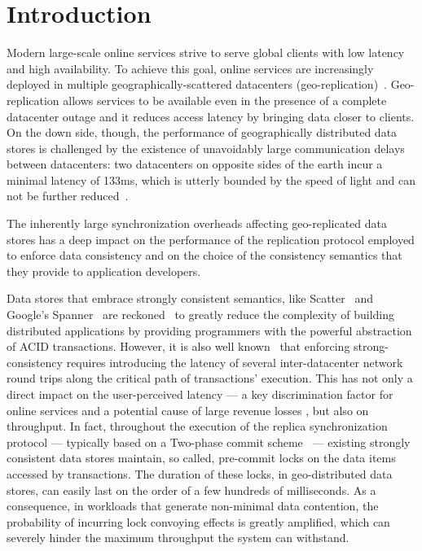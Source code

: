 \section{Introduction}
\label{sec:introduction}

Modern large-scale online services strive to serve global clients with low latency and high availability. To achieve this goal, online services are increasingly deployed in multiple geographically-scattered datacenters (geo-replication)~\cite{spanner, kraska2013mdcc, li2012making}. Geo-replication allows services to be available even in the presence of a complete datacenter outage and it reduces access latency by bringing data closer to clients. On the down side, though, the performance of geographically distributed data stores is challenged by the existence of unavoidably large communication delays between datacenters: two datacenters on opposite sides of the earth incur a minimal latency of 133ms, which is utterly bounded by the speed of light and can not be further reduced~\cite{bailis2013highly}. 

The inherently large synchronization overheads affecting geo-replicated data stores has a deep impact on the performance of the replication protocol employed to enforce data consistency and on the choice of the consistency semantics that they provide to application developers.  

Data stores that embrace strongly consistent semantics, like Scatter~\cite{scatter} and Google's Spanner~\cite{spanner} are reckoned~\cite{shute2012f1} to greatly reduce the complexity of building distributed applications by providing programmers with the powerful abstraction of ACID transactions. However, it is also well known~\cite{brewer2012cap}  that enforcing strong-consistency requires introducing the latency of several inter-datacenter network round trips along the critical path of transactions' execution. This has not only a direct impact on the user-perceived latency --- a key discrimination factor for online services and a potential cause of large revenue losses  \cite{schurman2009user}, but also on throughput. In fact, throughout the execution of the replica synchronization protocol --- typically based on a Two-phase commit scheme~\cite{spanner,peluso2012score} --- existing strongly consistent data stores maintain, so called, pre-commit locks on the data items accessed by transactions. The duration of these locks, in geo-distributed data stores, can easily last on the order of a few hundreds of milliseconds. As a consequence, in workloads that generate non-minimal data contention, the probability of incurring lock convoying effects is greatly amplified, which can severely hinder the maximum throughput the system can withstand.

